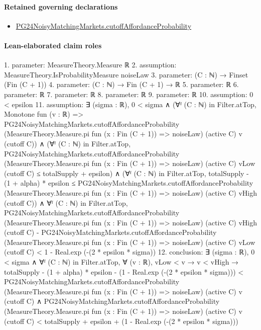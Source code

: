 \documentclass[10pt]{article}
\begin{document}
\paragraph{Retained governing declarations}
\begin{itemize}\raggedright
\item \hyperlink{governing-declaration-a4a2a08d89f647e4}{PG24\allowbreak{}Noisy\allowbreak{}Matching\allowbreak{}Markets.\allowbreak{}cutoff\allowbreak{}Affordance\allowbreak{}Probability}
\end{itemize}
\paragraph{Lean-elaborated claim roles}\begin{ReviewVerbatim}
1. parameter: MeasureTheory.Measure ℝ
2. assumption: MeasureTheory.IsProbabilityMeasure noiseLaw
3. parameter: (C : ℕ) → Finset (Fin (C + 1))
4. parameter: (C : ℕ) → Fin (C + 1) → ℝ
5. parameter: ℝ
6. parameter: ℝ
7. parameter: ℝ
8. parameter: ℝ
9. parameter: ℝ
10. assumption: 0 < epsilon
11. assumption: ∃ (sigma : ℝ),
  0 < sigma ∧
    (∀ᶠ (C : ℕ) in Filter.atTop,
        Monotone fun (v : ℝ) =>
          PG24NoisyMatchingMarkets.cutoffAffordanceProbability
            (MeasureTheory.Measure.pi fun (x : Fin (C + 1)) => noiseLaw) (active C) v (cutoff C)) ∧
      (∀ᶠ (C : ℕ) in Filter.atTop,
          PG24NoisyMatchingMarkets.cutoffAffordanceProbability
              (MeasureTheory.Measure.pi fun (x : Fin (C + 1)) => noiseLaw) (active C) vLow (cutoff C) ≤
            totalSupply + epsilon) ∧
        (∀ᶠ (C : ℕ) in Filter.atTop,
            totalSupply - (1 + alpha) * epsilon ≤
              PG24NoisyMatchingMarkets.cutoffAffordanceProbability
                (MeasureTheory.Measure.pi fun (x : Fin (C + 1)) => noiseLaw) (active C) vHigh (cutoff C)) ∧
          ∀ᶠ (C : ℕ) in Filter.atTop,
            PG24NoisyMatchingMarkets.cutoffAffordanceProbability
                  (MeasureTheory.Measure.pi fun (x : Fin (C + 1)) => noiseLaw) (active C) vHigh (cutoff C) -
                PG24NoisyMatchingMarkets.cutoffAffordanceProbability
                  (MeasureTheory.Measure.pi fun (x : Fin (C + 1)) => noiseLaw) (active C) vLow (cutoff C) <
              1 - Real.exp (-(2 * epsilon * sigma))
12. conclusion: ∃ (sigma : ℝ),
  0 < sigma ∧
    ∀ᶠ (C : ℕ) in Filter.atTop,
      ∀ (v : ℝ),
        vLow < v →
          v < vHigh →
            totalSupply - (1 + alpha) * epsilon - (1 - Real.exp (-(2 * epsilon * sigma))) <
                PG24NoisyMatchingMarkets.cutoffAffordanceProbability
                  (MeasureTheory.Measure.pi fun (x : Fin (C + 1)) => noiseLaw) (active C) v (cutoff C) ∧
              PG24NoisyMatchingMarkets.cutoffAffordanceProbability
                  (MeasureTheory.Measure.pi fun (x : Fin (C + 1)) => noiseLaw) (active C) v (cutoff C) <
                totalSupply + epsilon + (1 - Real.exp (-(2 * epsilon * sigma)))
\end{ReviewVerbatim}
\end{document}
